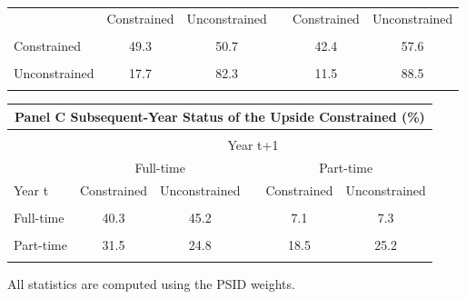 \begin{center}
\begin{threeparttable}
\begin{tabular}{lccccc}
                          & Constrained &  Unconstrained && Constrained & Unconstrained \\ \\
Constrained               &  49.3       &  50.7          && 42.4        & 57.6          \\ \\
Unconstrained             &  17.7       &  82.3          && 11.5        & 88.5          \\ \\
\hline
\end{tabular}

\begin{tabular}{lccccc}
\multicolumn{6}{c}{Panel C Subsequent-Year Status of the Upside Constrained (\%)} \\
\hline \\[-1ex]
                          & \multicolumn{5}{c}{Year t+1}\\
\cline{2-6}

                          & \multicolumn{2}{c}{Full-time} && \multicolumn{2}{c}{Part-time}  \\
Year t                    & Constrained &  Unconstrained  && Constrained & Unconstrained \\ \\
Full-time                 & 40.3        &  45.2           && 7.1         & 7.3          \\ \\
Part-time                 & 31.5        &  24.8           && 18.5        & 25.2          \\ \\
\hline
\end{tabular}
\begin{tablenotes}
\item[] \footnotesize{All statistics are computed using the PSID weights.}
\end{tablenotes}
\label{sum}
\end{threeparttable}
\end{center}

\clearpage

